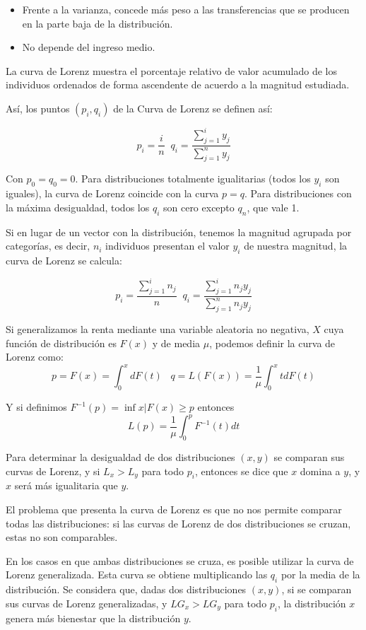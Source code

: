 \begin{itemize}
\item Frente a la varianza, concede m\'as peso a las transferencias que se producen en la parte baja de la distribuci\'on.
\item No depende del ingreso medio.
\end{itemize}


La curva de Lorenz muestra el porcentaje relativo de valor acumulado de los individuos ordenados de forma ascendente de acuerdo a la magnitud estudiada.

As\'i, los puntos $(p_i,q_i)$ de la Curva de Lorenz se definen as\'i:

\[p_i=\dfrac{i}{n} \;\; q_i=\dfrac{\sum_{j=1}^iy_j}{\sum_{j=1}^ny_j}\]

Con $p_0=q_0=0$. Para distribuciones totalmente igualitarias (todos los $y_i$ son iguales), la curva de Lorenz coincide con la curva $p=q$. Para distribuciones con la m\'axima desigualdad, todos los $q_i$ son cero excepto $q_n$, que vale 1.

Si en lugar de un vector con la distribuci\'on, tenemos la magnitud agrupada por categor\'ias, es decir, $n_i$ individuos presentan el valor $y_i$ de nuestra magnitud, la curva de Lorenz se calcula:

\[p_i=\dfrac{\sum_{j=1}^in_j}{n} \;\; q_i=\dfrac{\sum_{j=1}^in_jy_j}{\sum_{j=1}^nn_jy_j}\]

Si generalizamos la renta mediante una variable aleatoria no negativa, $X$ cuya funci\'on de distribuci\'on es $F(x)$ y de media $\mu$, podemos definir la curva de Lorenz como:
\[p=F(x)=\int_0^xdF(t)\;\;\; q=L(F(x))=\dfrac{1}{\mu}\int_0^xtdF(t)\]

Y si definimos $F^{-1}(p)=\inf{x|F(x)\geq p}$ entonces
\[L(p)=\dfrac{1}{\mu}\int_0^pF^{-1}(t)dt\]

Para determinar la desigualdad de dos distribuciones $(x,y)$ se comparan sus curvas de Lorenz, y si $L_x>L_y$ para todo $p_i$, entonces se dice que $x$ domina a $y$, y $x$ ser\'a m\'as igualitaria que $y$.

El problema que presenta la curva de Lorenz es que no nos permite comparar todas las distribuciones: si las curvas de Lorenz de dos distribuciones se cruzan, estas no son comparables.

En los casos en que ambas distribuciones se cruza, es posible utilizar la curva de Lorenz generalizada. Esta curva se obtiene multiplicando las $q_i$ por la media de la distribuci\'on. Se considera que, dadas dos distribuciones $(x,y)$, si se comparan sus curvas de Lorenz generalizadas, y  $LG_x>LG_y$ para todo $p_i$, la distribuci\'on $x$ genera m\'as bienestar que la distribuci\'on $y$.

